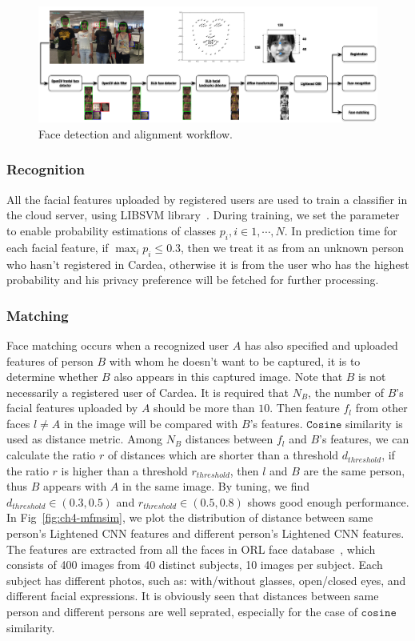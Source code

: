 \begin{figure}[!htbp]
    \centering
    \includegraphics[width=1.0\textwidth]{figure/ch4-facedetalign.pdf}
    \caption{Face detection and alignment workflow.}
    \label{fig:ch4-facedetalign}
\end{figure}

\subsubsection{Recognition}
All the facial features uploaded by registered users are used to train a classifier in the cloud server, using LIBSVM library~\cite{chang2011libsvm}. During training, we set the parameter to enable probability estimations of classes $p_i, i\in{1, \cdots, N}$. In prediction time for each facial feature, if $\max_ip_i \leq 0.3$, then we treat it as from an unknown person who hasn't registered in Cardea, otherwise it is from the user who has the highest probability and his privacy preference will be fetched for further processing.

\subsubsection{Matching}
Face matching occurs when a recognized user $A$ has also specified and uploaded features of person $B$ with whom he doesn't want to be captured, it is to determine whether $B$ also appears in this captured image. Note that $B$ is not necessarily a registered user of Cardea. It is required that $N_B$, the number of $B$'s facial features uploaded by $A$ should be more than $10$. Then feature $f_l$ from other faces $l\neq A$ in the image will be compared with $B$'s features. $\mathtt{Cosine}$ similarity is used as distance metric. Among $N_B$ distances between $f_l$ and $B$'s features, we can calculate the ratio $r$ of distances which are shorter than a threshold $d_ \mathit{threshold}$, if the ratio $r$ is higher than a threshold $r_ \mathit{threshold}$, then $l$ and $B$ are the same person, thus $B$ appears with $A$ in the same image. By tuning, we find $d_ \mathit{threshold} \in (0.3, 0.5)$ and $r_ \mathit{threshold} \in (0.5, 0.8) $ shows good enough performance. In Fig~\ref{fig:ch4-mfmsim}, we plot the distribution of distance between same person's Lightened CNN features and different person's Lightened CNN features. The features are extracted from all the faces in ORL face database~\cite{links:orlfacedb}, which consists of 400 images from 40 distinct subjects, 10 images per subject. Each subject has different photos, such as: with/without glasses, open/closed eyes, and different facial expressions. It is obviously seen that distances between same person and different persons are well seprated, especially for the case of $\mathtt{cosine}$ similarity.

